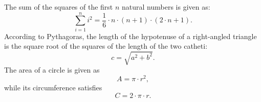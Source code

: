 \documentclass{article}
\begin{document}
The sum of the squares of the first $n$ natural numbers is given as:
$$ \sum\limits_{i=1}^{n} i^{2} = \frac{1}{6} \cdot n \cdot (n+1) \cdot (2\cdot n + 1). $$
According to Pythagoras, the length of the hypotenuse of a right-angled triangle is
the square root of the squares of the length of the two catheti:
$$ c = \sqrt{a^{2} + b^{2}}.  $$
The area of a circle is given as 
$$  A = \pi \cdot r^{2},   $$ 
while its circumference satisfies
$$ C = 2 \cdot \pi \cdot r.  $$
\end{document}
